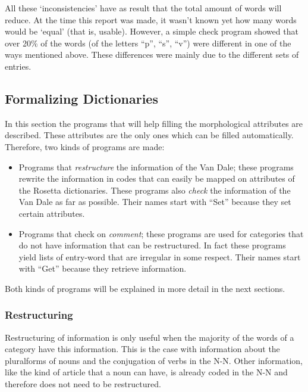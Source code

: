 All these `inconsistencies' have as result that the total amount of words will
reduce. At the time this report was made, it wasn't known yet how many words
would be `equal' (that is, usable). However, a simple check program showed that 
over 20\% of the words (of the letters ``p'', ``s'', ``v'') were different in 
one of the ways mentioned above. These differences were mainly due to the 
different sets of entries.
 
\subsection{Formalizing Dictionaries}
 
In this section the programs that will help filling the morphological 
attributes are described. These attributes are the only ones which can be 
filled automatically. Therefore, two kinds of programs are made:
 
\begin{itemize}
  \item Programs that {\em restructure} the information of the Van Dale; these
        programs rewrite the information in codes that can easily be mapped 
        on attributes of the Rosetta dictionaries. These programs also
        {\em check} the information of the Van Dale as far as possible.
        Their names start with ``Set'' because they set certain attributes.
  \item Programs that check on {\em comment}; these programs are used for
        categories that do not have information that can be restructured.
        In fact these programs yield lists of entry-word that are irregular
        in some respect. Their names start with ``Get'' because they retrieve
        information.
\end{itemize}
 
Both kinds of programs will be explained in more detail in the next sections.
 
\subsubsection{Restructuring}
 
Restructuring of information is only useful when the majority of the words
of a category have this information. This is the case with information
about the pluralforms of nouns and the conjugation of verbs in the N-N.
Other information, like the kind of article that a noun can have, is already
coded in the N-N and therefore does not need to be restructured.
 
